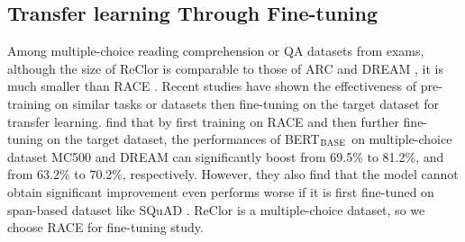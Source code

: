 \documentclass{article} \usepackage{iclr2020_conference,times}
\newcommand\bertbase{BERT$_{\small \textsc{BASE}}$\xspace}
\begin{document}
\subsection{Transfer learning Through Fine-tuning}
Among multiple-choice reading comprehension or QA datasets from exams, although the size of ReClor is comparable to those of ARC \citep{clark2018think} and DREAM \citep{sun2019dream}, it is much smaller than RACE \cite{lai2017race}. Recent studies \citep{min2017question, howard2018universal, huang2019cosmos, jin2019mmm} have shown the effectiveness of pre-training on similar tasks or datasets then fine-tuning on the target dataset for transfer learning. \citet{jin2019mmm} find that by first training on RACE \citep{lai2017race} and then further fine-tuning on the target dataset, the performances of \bertbase on multiple-choice dataset MC500 \citep{richardson2013mctest} and DREAM \citep{sun2019dream} can significantly boost from 69.5\% to 81.2\%, and from 63.2\% to 70.2\%, respectively. However, they also find that the model cannot  obtain significant improvement even performs worse if it is first fine-tuned on span-based dataset like SQuAD \citep{rajpurkar2016squad}. ReClor is a multiple-choice dataset, so we choose RACE for fine-tuning study. 
\end{document}
